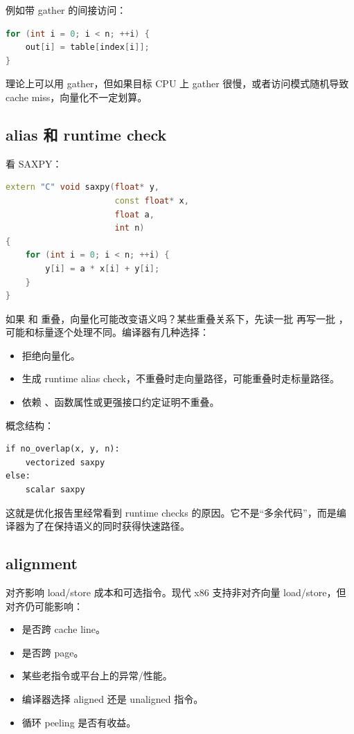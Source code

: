例如带 gather 的间接访问：

\begin{lstlisting}[language=C++]
for (int i = 0; i < n; ++i) {
    out[i] = table[index[i]];
}
\end{lstlisting}

理论上可以用 gather，但如果目标 CPU 上 gather 很慢，或者访问模式随机导致 cache miss，向量化不一定划算。

\subsection{alias 和 runtime check}

看 SAXPY：

\begin{lstlisting}[language=C++]
extern "C" void saxpy(float* y,
                      const float* x,
                      float a,
                      int n)
{
    for (int i = 0; i < n; ++i) {
        y[i] = a * x[i] + y[i];
    }
}
\end{lstlisting}

如果  和  重叠，向量化可能改变语义吗？某些重叠关系下，先读一批  再写一批 ，可能和标量逐个处理不同。编译器有几种选择：

\begin{itemize}
  \item 拒绝向量化。
  \item 生成 runtime alias check，不重叠时走向量路径，可能重叠时走标量路径。
  \item 依赖 、函数属性或更强接口约定证明不重叠。
\end{itemize}

概念结构：

\begin{lstlisting}
if no_overlap(x, y, n):
    vectorized saxpy
else:
    scalar saxpy
\end{lstlisting}

这就是优化报告里经常看到 runtime checks 的原因。它不是“多余代码”，而是编译器为了在保持语义的同时获得快速路径。

\subsection{alignment}

对齐影响 load/store 成本和可选指令。现代 x86 支持非对齐向量 load/store，但对齐仍可能影响：

\begin{itemize}
  \item 是否跨 cache line。
  \item 是否跨 page。
  \item 某些老指令或平台上的异常/性能。
  \item 编译器选择 aligned 还是 unaligned 指令。
  \item 循环 peeling 是否有收益。
\end{itemize}

